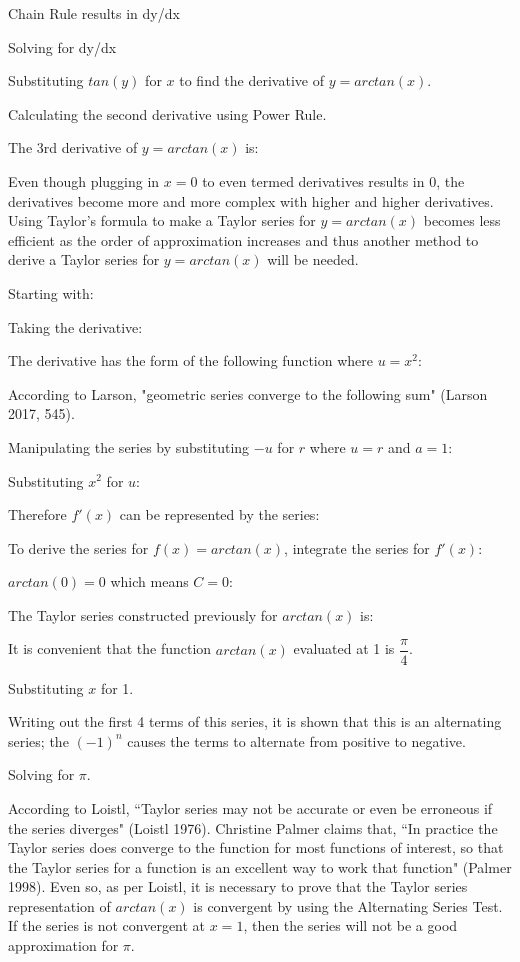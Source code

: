 Chain Rule results in dy/dx

Solving for dy/dx

Substituting \(tan(y)\) for \(x\) to find the derivative of \(y = arctan(x)\).

Calculating the second derivative using Power Rule.

The 3rd derivative of \(y = arctan(x)\) is:

Even though plugging in \(x = 0\) to even termed derivatives results in 0, the derivatives become more and more complex with higher and higher derivatives. Using Taylor's formula to make a Taylor series for \(y = arctan(x)\) becomes less efficient as the order of approximation increases and thus another method to derive a Taylor series for \(y = arctan(x)\) will be needed.

Starting with:

Taking the derivative:

The derivative has the form of the following function where \(u = x^2\):

According to Larson, "geometric series converge to the following sum" (Larson 2017, 545).

Manipulating the series by substituting \(-u\) for \(r\) where \(u = r\) and \(a = 1\):

Substituting \(x^{2}\) for \(u\): 

Therefore \(f'(x)\) can be represented by the series:

To derive the series for \(f(x) = arctan(x)\), integrate the series for \(f'(x)\):

\(arctan(0) = 0\) which means \(C = 0\):

The Taylor series constructed previously for \(arctan(x)\) is:

It is convenient that the function \(arctan(x)\) evaluated at 1 is \(\dfrac{\pi}{4}\).

Substituting \(x\) for 1.

Writing out the first 4 terms of this series, it is shown that this is an alternating series; the \((-1)^{n}\) causes the terms to alternate from positive to negative.

Solving for \(\pi\).

According to Loistl, ``Taylor series may not be accurate or even be erroneous if the series diverges" (Loistl 1976). Christine Palmer claims that, ``In practice the Taylor series does converge to the function for most functions of interest, so that the Taylor series for a function is an excellent way to work that function" (Palmer 1998). Even so, as per Loistl, it is necessary to prove that the Taylor series representation of \(arctan(x)\) is convergent by using the Alternating Series Test. If the series is not convergent at \(x = 1\), then the series will not be a good approximation for \(\pi\).

